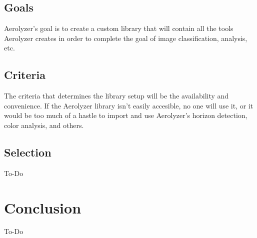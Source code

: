 \documentclass[onecolumn, draftclsnofoot,10pt, compsoc]{IEEEtran}
\begin{document}
\begin{flushleft}
\subsection{Goals}
Aerolyzer's goal is to create a custom library that will contain all the tools Aerolyzer creates in order to complete the goal of image classification, analysis, etc.

\subsection{Criteria}
The criteria that determines the library setup will be the availability and convenience. If the Aerolyzer library isn't easily accesible, no one will use it, or it would be too much of a hastle to import and use Aerolyzer's horizon detection, color analysis, and others.
\subsection{Selection}
To-Do



\section{Conclusion}
To-Do

\end{flushleft}


\clearpage
\end{document}
